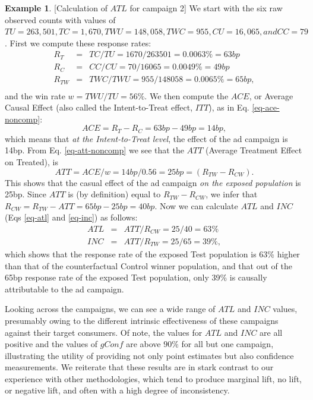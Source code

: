 \documentclass[11pt,a4paper]{article}
\theoremstyle{definition}
\theoremstyle{remark}
\theoremstyle{definition}
\newtheorem{example}{Example}[section]
\theoremstyle{definition}
\theoremstyle{definition}
\theoremstyle{definition}
\theoremstyle{definition}
\theoremstyle{definition}
\begin{document}
\begin{example}\small [Calculation of $ATL$ for campaign 2]
We start with the six raw observed counts with values of $TU=263,501, TC=1,670, TWU=148,058, TWC=955, CU=16,065, and CC=79$. First we compute these response rates:
\begin{eqnarray*}
	R_{T} &= & TC/TU = 1670/263501 = 0.0063\% = 63bp\\
	R_C   &= & CC/CU = 70/16065 = 0.0049\%  = 49bp\\
	R_{TW} &=& TWC/TWU = 955/148058 = 0.0065\% = 65bp, \\
\end{eqnarray*}
and the win rate $w = TWU/TU = 56\%$.
We then compute the $ACE$, or Average Causal Effect (also called the Intent-to-Treat effect, $ITT$), as in Eq. \ref{eq-ace-noncomp}:
\begin{equation}
	ACE = R_T - R_C = 63bp - 49bp = 14bp,
\end{equation}
which means that \textit{at the Intent-to-Treat level}, the effect of the ad campaign is 14bp. From Eq. \ref{eq-att-noncomp} we see that the $ATT$ (Average Treatment Effect on Treated), is 
\begin{equation}
	ATT = ACE/w = 14bp/0.56 = 25bp = (R_{TW} - R_{CW}).
\end{equation}
This shows that the casual effect of the ad campaign \textit{on the exposed population}	is 25bp. Since $ATT$ is (by definition) equal to $R_{TW} - R_{CW}$, we infer that $R_{CW} = R_{TW} - ATT = 65bp - 25bp = 40bp$.
Now we can calculate $ATL$ and $INC$ (Eqs \ref{eq-atl} and \ref{eq-inc}) as follows:
\begin{eqnarray*}
	ATL &=& ATT/R_{CW} = 25/40 = 63\%	\\
	INC &=& ATT/R_{TW} = 25/65 = 39\%,
\end{eqnarray*}
which shows that the response rate of the exposed Test population is 63\% higher than that of the counterfactual Control winner population, and that out of the 65bp response rate of the exposed Test population, only 39\% is causally attributable to the ad campaign.
\qedsymbol
\end{example}

Looking across the campaigns, we can see a wide range of $ATL$ and $INC$ values, presumably owing to the different intrinsic effectiveness of these campaigns against their target consumers. Of note, the values for $ATL$ and $INC$ are all positive and the values of $gConf$ are above $90\%$ for all but one campaign, illustrating the utility of providing not only point estimates but also confidence measurements. We reiterate that these results are in stark contrast to our experience with other methodologies, which tend to produce marginal lift, no lift, or negative lift, and often with a high degree of inconsistency.
\end{document}
